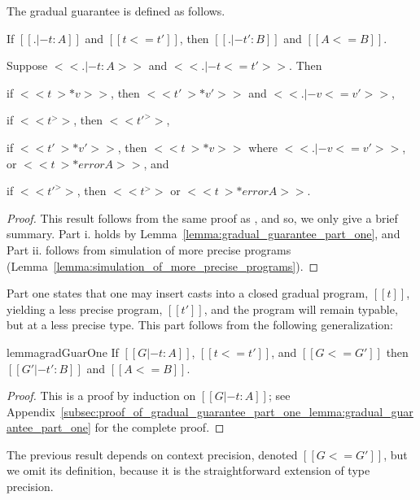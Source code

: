 The gradual guarantee is defined as follows.
\begin{theorem}
  \label{thm:gradual_guarantee} 
  \begin{enumR}
  \item If $[[. |- t : A]]$ and $[[t <= t']]$, then $[[. |- t' : B]]$ and $[[A <= B]]$.
  \item Suppose $<<. |- t : A>>$ and $<<. |- t <= t'>>$. Then
    \begin{enumA}
    \item if $<<t ~>* v>>$, then $<<t' ~>* v'>>$ and $<<. |- v <= v'>>$,
    \item if $<<t ^>>$, then $<<t' ^>>$,
    \item if $<<t' ~>* v'>>$, then $<<t ~>* v>>$ where $<<. |- v <= v'>>$, or $<<t ~>* error A>>$, and
    \item if $<<t' ^>>$, then $<<t ^>>$ or $<<t ~>* error A>>$.
    \end{enumA}
  \end{enumR}
\end{theorem}
\begin{proof}
  This result follows from the same proof as \cite{Siek:2015}, and so,
  we only give a brief summary.  Part i. holds by
  Lemma~\ref{lemma:gradual_guarantee_part_one}, and Part ii. follows
  from simulation of more precise programs
  (Lemma~\ref{lemma:simulation_of_more_precise_programs}).
\end{proof}
Part one states that one may insert casts into a closed gradual
program, $[[t]]$, yielding a less precise program, $[[t']]$, and the
program will remain typable, but at a less precise type.  This part
follows from the following generalization:
\begin{restatable}{lemma}{gradGuarOne}
  \label{lemma:gradual_guarantee_part_one}
  If $[[G |- t : A]]$, $[[t <= t']]$, and $[[G <= G']]$ then $[[G' |- t' : B]]$ and $[[A <= B]]$.
\end{restatable}
\begin{proof}
  This is a proof by induction on $[[G |- t : A]]$; see
  Appendix~\ref{subsec:proof_of_gradual_guarantee_part_one_lemma:gradual_guarantee_part_one}
  for the complete proof.
\end{proof}
The previous result depends on context precision, denoted $[[G <=
    G']]$, but we omit its definition, because it is the
straightforward extension of type precision.

